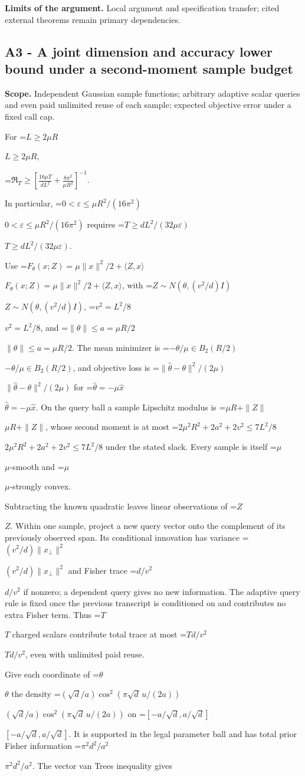 \documentclass[10pt,a4paper]{article}
\newcommand{\AtlasMath}[1]{\par\begingroup\centering\setbox0=\hbox{$\displaystyle #1$}\ifdim\wd0>1.4\linewidth\typeout{ATLAS WIDE FORMULA: \the\wd0}\fi\ifdim\wd0>\linewidth\resizebox{\linewidth}{!}{\box0}\else\box0\fi\par\endgroup}
\newcommand{\AtlasInlineMath}[1]{\begingroup\setbox0=\hbox{$#1$}\ifdim\wd0>.4\linewidth\endgroup\AtlasMath{#1}\else\endgroup$#1$\fi}
\begin{document}
\textbf{Limits of the argument.} Local argument and specification transfer; cited external theorems remain primary dependencies.

\subsection{A3 - A joint dimension and accuracy lower bound under a second-moment sample budget}
\textbf{Scope.} Independent Gaussian sample functions; arbitrary adaptive scalar queries and even paid unlimited reuse of each sample; expected objective error under a fixed call cap.

For \AtlasInlineMath{L\ge2\mu R},

\AtlasMath{\mathfrak R_T\ge\left[\frac{16\mu T}{dL^2}+\frac{8\pi^2}{\mu R^2}\right]^{-1}.}

In particular, \AtlasInlineMath{0<\varepsilon\le\mu R^2/(16\pi^2)} requires \AtlasInlineMath{T\ge dL^2/(32\mu\varepsilon)}.

Use \AtlasInlineMath{F_\theta(x;Z)=\mu\|x\|^2/2+\langle Z,x\rangle}, with \AtlasInlineMath{Z\sim N(\theta,(v^2/d)I)}, \AtlasInlineMath{v^2=L^2/8}, and \AtlasInlineMath{\|\theta\|\le a=\mu R/2}. The mean minimizer is \AtlasInlineMath{-\theta/\mu\in B_2(R/2)}, and objective loss is \AtlasInlineMath{\|\widehat\theta-\theta\|^2/(2\mu)} for \AtlasInlineMath{\widehat\theta=-\mu\widehat x}. On the query ball a sample Lipschitz modulus is \AtlasInlineMath{\mu R+\|Z\|}, whose second moment is at most \AtlasInlineMath{2\mu^2R^2+2a^2+2v^2\le7L^2/8} under the stated slack. Every sample is itself \AtlasInlineMath{\mu}-smooth and \AtlasInlineMath{\mu}-strongly convex.

Subtracting the known quadratic leaves linear observations of \AtlasInlineMath{Z}. Within one sample, project a new query vector onto the complement of its previously observed span. Its conditional innovation has variance \AtlasInlineMath{(v^2/d)\|x_\perp\|^2} and Fisher trace \AtlasInlineMath{d/v^2} if nonzero; a dependent query gives no new information. The adaptive query rule is fixed once the previous transcript is conditioned on and contributes no extra Fisher term. Thus \AtlasInlineMath{T} charged scalars contribute total trace at most \AtlasInlineMath{Td/v^2}, even with unlimited paid reuse.

Give each coordinate of \AtlasInlineMath{\theta} the density \AtlasInlineMath{(\sqrt d/a)\cos^2(\pi\sqrt d\,u/(2a))} on \AtlasInlineMath{[-a/\sqrt d,a/\sqrt d]}. It is supported in the legal parameter ball and has total prior Fisher information \AtlasInlineMath{\pi^2d^2/a^2}. The vector van Trees inequality gives
\end{document}
